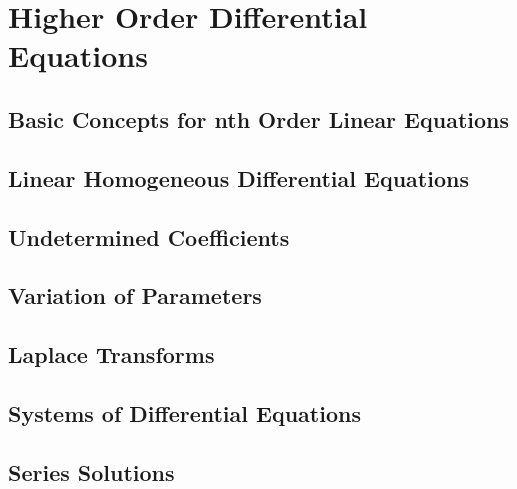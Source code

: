 \documentclass[../satmath.tex]{subfiles}
\begin{document}
\chapter{Higher Order Differential Equations}
\section{Basic Concepts for nth Order Linear Equations}
\section{Linear Homogeneous Differential Equations}
\section{Undetermined Coefficients}
\section{Variation of Parameters}
\section{Laplace Transforms}
\section{Systems of Differential Equations}
\section{Series Solutions}
\end{document}
